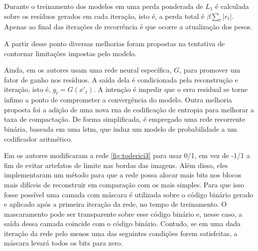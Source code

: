 

Durante o treinamento dos modelos em \cite{FullResolution2017Toderici} uma perda ponderada de $L_1$ é calculada sobre os resíduos gerados em cada iteração, isto é, a perda total é $\beta \sum_t|r_t|$. Apenas ao final das iterações de recorrência é que ocorre a atualização dos pesos. 

A partir desse ponto diversas melhorias foram propostas na tentativa de contornar limitações impostas pelo modelo.


Ainda, em \cite{FullResolution2017Toderici} os autores usam uma rede neural específica, $G$,  para promover um fator de ganho nos resíduos. A saída dela é condicionada pela reconstrução e iteração, isto é, $g_t = G(x'_t)$. A intenção é impedir que o erro residual se torne ínfimo a ponto de comprometer a convergência do modelo. 
Outra melhoria proposta foi a adição de uma nova \acrshort{rna} de codificação de entropia para melhorar a taxa de compactação. De forma simplificada, é empregado uma rede recorrente binária, baseada em uma \acrshort{lstm}, que induz um modelo de probabilidade a um codificador aritmético.



Em \cite{target} os autores modificaram a rede \ref{fig:toderici3} 
para usar 0/1, em vez de -1/1 a fim de evitar artefatos de limite nas bordas das imagens. Além disso, eles implementaram um método para que a rede possa alocar mais bits nos blocos mais difíceis de reconstruir em comparação com os mais simples. 
Para que isso fosse possível uma camada com máscara é utilizada sobre o código binário gerado e aplicado após a primeira iteração da rede, no tempo de treinamento.
O mascaramento pode ser transparente sobre esse código binário e, nesse caso, a saída dessa camada coincide com o código binário. Contudo, se em uma dada iteração da rede pelo menos uma das seguintes condições forem satisfeitas, a máscara levará todos os bits para zero. 

